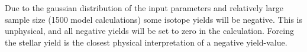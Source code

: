 

Due to the gaussian distribution of the input parameters and relatively large sample size (1500 model calculations) some isotope yields will be negative.
This is unphysical, and all negative yields will be set to zero in the calculation.
Forcing the stellar yield is the closest physical interpretation of a negative yield-value.

